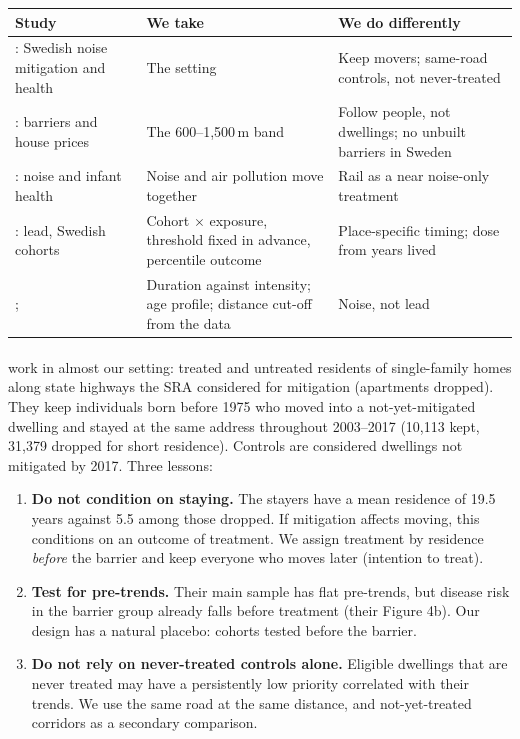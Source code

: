 \documentclass[11pt]{article}
\begin{document}
\begin{center}
\footnotesize
\renewcommand{\arraystretch}{1.25}
\begin{tabular}{@{}L{0.31\textwidth}L{0.3\textwidth}L{0.32\textwidth}@{}}
\toprule
\textbf{Study} & \textbf{We take} & \textbf{We do differently} \\
\midrule
\textcite{lindgrenSoundEnvironmentHealth2021}: Swedish noise mitigation and health & The setting & Keep movers; same-road controls, not never-treated \\
\textcite{morettiTrafficNoiseExternality2025}: barriers and house prices & The 600--1,500\,m band & Follow people, not dwellings; no unbuilt barriers in Sweden \\
\textcite{greenhillNoisePollutionInfant2026}: noise and infant health & Noise and air pollution move together & Rail as a near noise-only treatment \\
\textcite{gronqvistUnderstandingHowLow2020}: lead, Swedish cohorts & Cohort \(\times\) exposure, threshold fixed in advance, percentile outcome & Place-specific timing; dose from years lived \\
\textcite{hollingsworthThousandCutsCumulative2025}; \textcite{berkhoutLeadExposureCognitive2025} & Duration against intensity; age profile; distance cut-off from the data & Noise, not lead \\
\bottomrule
\end{tabular}
\end{center}

\paragraph{\textcite{lindgrenSoundEnvironmentHealth2021}} work in almost our setting:
treated and untreated residents of single-family homes along state highways the SRA
considered for mitigation (apartments dropped). They keep individuals born before 1975 who
moved into a not-yet-mitigated dwelling and stayed at the same address throughout 2003--2017
(10,113 kept, 31,379 dropped for short residence). Controls are considered dwellings not
mitigated by 2017. Three lessons:
\begin{enumerate}
\item \textbf{Do not condition on staying.} The stayers have a mean residence of 19.5 years
  against 5.5 among those dropped. If mitigation affects moving, this conditions on an outcome
  of treatment. We assign treatment by residence \emph{before} the barrier and keep everyone
  who moves later (intention to treat).
\item \textbf{Test for pre-trends.} Their main sample has flat pre-trends, but disease risk in
  the barrier group already falls before treatment (their Figure 4b). Our design has a natural
  placebo: cohorts tested before the barrier.
\item \textbf{Do not rely on never-treated controls alone.} Eligible dwellings that are never
  treated may have a persistently low priority correlated with their trends. We use the same
  road at the same distance, and not-yet-treated corridors as a secondary comparison.
\end{enumerate}
\end{document}
